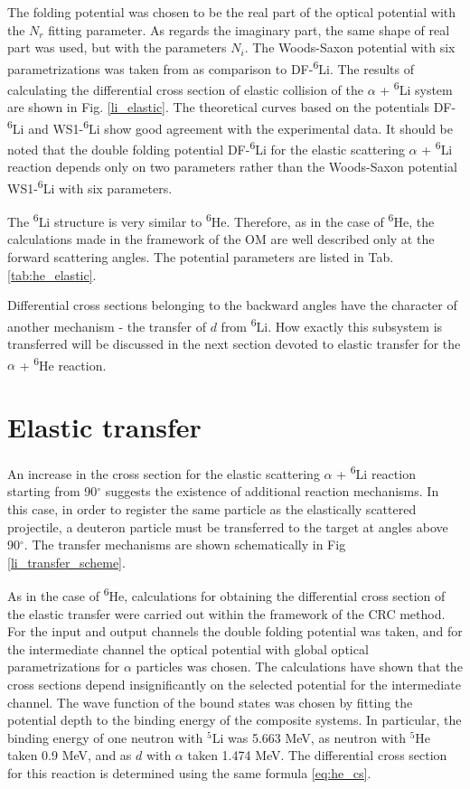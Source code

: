 \documentclass[
12pt, %
oneside, %
english, %
doublespacing, %
doublespacing, %
toctotoc, %
parskip, %
headsepline, %
]{MastersDoctoralThesis} %
\newcommand{\he}{\textsuperscript{6}He\xspace}
\newcommand{\li}{\textsuperscript{6}Li\xspace}
\begin{document}
The folding potential was chosen to be the real part of the optical potential with the $N_r$ fitting parameter. As regards the imaginary part, the same shape of real part was used, but with the parameters $N_i$. 
The Woods-Saxon potential with six parametrizations was taken from \cite{oganessian1999dynamics} as comparison to DF-\li.  
The results of calculating the differential cross section of elastic collision of the $ \alpha $ + \li system are shown in Fig. \ref{li_elastic}. 
The theoretical curves based on the potentials DF-\li and WS1-\li show good agreement with the experimental data.
 It should be noted that the double folding potential DF-\li  for the elastic scattering $\alpha$ + \li  reaction depends only on two parameters rather than the Woods-Saxon potential WS1-\li with six parameters.
 
  The \li structure is very similar to  \he. Therefore, as in the case of \he, the calculations made in the framework of the OM are well described only at the forward scattering angles. The potential parameters are listed in Tab. \ref{tab:he_elastic}.
 
 Differential cross sections belonging to the backward angles have the character of another mechanism - the transfer of $d$ from \li. 
 How exactly this subsystem is transferred will be discussed in the next section devoted to elastic transfer for the $ \alpha$ + \he reaction.
 



\section{Elastic transfer}
An increase in the cross section for the elastic scattering $\alpha$ + \li  reaction starting from 90$^\circ$ suggests the existence of additional reaction mechanisms.
 In this case, in order to register the same particle as the elastically scattered projectile, a deuteron particle must be transferred to the target at angles above 90$^\circ$. 
 The transfer mechanisms are shown schematically in Fig \ref{li_transfer_scheme}.


As in the case of \he, calculations for obtaining the differential cross section of the elastic transfer were carried out within the framework of the CRC method. 
For the input and output channels the double folding potential was taken, and for the intermediate channel the optical potential with global optical parametrizations for $\alpha$ particles \cite{avrigeanu1994global}  was chosen. 
The calculations have shown that the cross sections depend insignificantly on the selected potential for the intermediate channel. 
The wave function of the bound states was chosen by fitting the potential depth to the binding energy of the composite systems. 
In particular, the binding energy of one neutron with $^5$Li was 5.663 MeV, as neutron with $^5$He taken 0.9 MeV, and as $d$ with  $\alpha$  taken 1.474 MeV. 
The differential cross section for this reaction is determined using the same formula \ref{eq:he_cs}.
\end{document}
